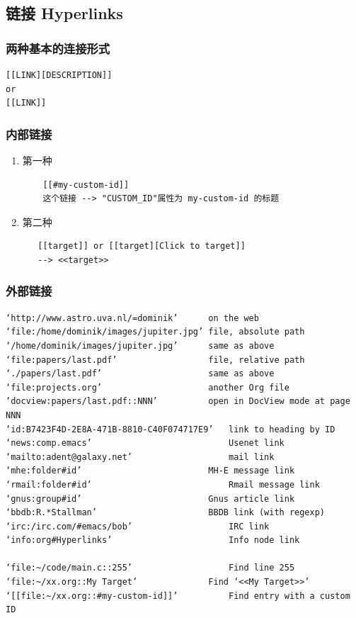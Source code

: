 \documentclass[11pt]{article}
\begin{document}
\subsection{链接 Hyperlinks}
\label{sec:org6c66eca}
\subsubsection{两种基本的连接形式}
\label{sec:org30c7776}
\begin{verbatim}
[[LINK][DESCRIPTION]]
or
[[LINK]]
\end{verbatim}

\subsubsection{内部链接}
\label{sec:orgc3795c7}
\begin{enumerate}
\item 第一种
\begin{verbatim}
    [[#my-custom-id]]
    这个链接 --> "CUSTOM_ID"属性为 my-custom-id 的标题
\end{verbatim}
\item 第二种
\begin{verbatim}
   [[target]] or [[target][Click to target]]
   --> <<target>>
\end{verbatim}
\end{enumerate}

\subsubsection{外部链接}
\label{sec:orgf51d278}
\begin{verbatim}
‘http://www.astro.uva.nl/=dominik’	    on the web
‘file:/home/dominik/images/jupiter.jpg’	file, absolute path
‘/home/dominik/images/jupiter.jpg’	    same as above
‘file:papers/last.pdf’	                file, relative path
‘./papers/last.pdf’	                    same as above
‘file:projects.org’	                    another Org file
‘docview:papers/last.pdf::NNN’	        open in DocView mode at page NNN
‘id:B7423F4D-2E8A-471B-8810-C40F074717E9’	link to heading by ID
‘news:comp.emacs’	                        Usenet link
‘mailto:adent@galaxy.net’	                mail link
‘mhe:folder#id’	                        MH-E message link
‘rmail:folder#id’	                        Rmail message link
‘gnus:group#id’	                        Gnus article link
‘bbdb:R.*Stallman’	                    BBDB link (with regexp)
‘irc:/irc.com/#emacs/bob’	                IRC link
‘info:org#Hyperlinks’	                    Info node link

‘file:~/code/main.c::255’	                Find line 255
‘file:~/xx.org::My Target’	            Find ‘<<My Target>>’
‘[[file:~/xx.org::#my-custom-id]]’	        Find entry with a custom ID
\end{verbatim}
\end{document}
